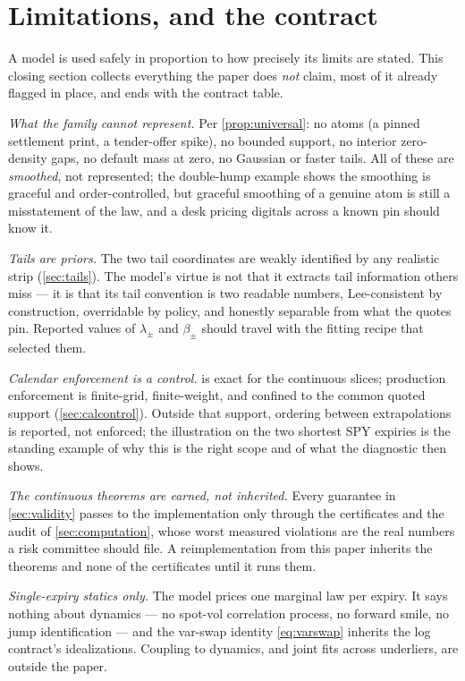 \section{Limitations, and the contract}
\label{sec:limits}

A model is used safely in proportion to how precisely its limits are
stated.  This closing section collects everything the paper does
\emph{not} claim, most of it already flagged in place, and ends with the
contract table.

\emph{What the family cannot represent.}  Per \cref{prop:universal}: no
atoms (a pinned settlement print, a tender-offer spike), no bounded
support, no interior zero-density gaps, no default mass at zero, no
Gaussian or faster tails.  All of these are \emph{smoothed}, not
represented; the double-hump example shows the smoothing is graceful and
order-controlled, but graceful smoothing of a genuine atom is still a
misstatement of the law, and a desk pricing digitals across a known pin
should know it.

\emph{Tails are priors.}  The two tail coordinates are weakly identified
by any realistic strip (\cref{sec:tails}).  The model's virtue is not
that it extracts tail information others miss --- it is that its tail
convention is two readable numbers, Lee-consistent by construction,
overridable by policy, and honestly separable from what the quotes pin.
Reported values of $\lambda_\pm$ and $\beta_\pm$ should travel with the
fitting recipe that selected them.

\emph{Calendar enforcement is a control.}   is
exact for the continuous slices; production enforcement is
finite-grid, finite-weight, and confined to the common quoted support
(\cref{sec:calcontrol}).  Outside that support, ordering between
extrapolations is reported, not enforced; the illustration on the two
shortest SPY expiries is the standing example of why this is the right
scope and of what the diagnostic then shows.

\emph{The continuous theorems are earned, not inherited.}  Every
guarantee in \cref{sec:validity} passes to the implementation only
through the certificates and the audit of \cref{sec:computation}, whose
worst measured violations are the real numbers a risk committee should
file.  A reimplementation from this paper inherits the theorems and
none of the certificates until it runs them.

\emph{Single-expiry statics only.}  The model prices one marginal law
per expiry.  It says nothing about dynamics --- no spot-vol correlation
process, no forward smile, no jump identification --- and the var-swap
identity \eqref{eq:varswap} inherits the log contract's idealizations.
Coupling to dynamics, and joint fits across underliers, are outside the
paper.

